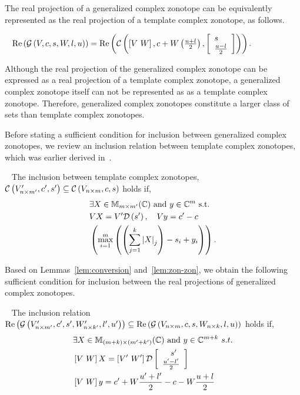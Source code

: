 


The real projection of a generalized complex zonotope can be
equivalently represented as the real projection of a template complex
zonotope, as follows.  
\begin{lemma}~\label{lem:conversion}
$\real\lt(\gcz{V}{c}{s}{W}{l}{u}\rt) = \real\lt(\cz{\lt[V~W\rt]}{c+W\lt(\frac{u+l}{2}\rt)}{\ColumnJoin{s}{\frac{u-l}{2}}}\rt)$.
\end{lemma}
Although the real projection of the generalized complex zonotope can
be expressed as a real projection of a template complex zonotope, a
generalized complex zonotope itself can not be represented as as a
template complex zonotope.  Therefore, generalized complex zonotopes
constitute a larger class of sets than template complex zonotopes.

Before stating a sufficient condition for inclusion between generalized complex
zonotopes, we review an inclusion relation between template complex
zonotopes, which was earlier derived in~\cite{todo}.
\begin{lemma}~\label{lem:zon-zon} The inclusion between template complex zonotopes,
  $\cz{V^\pr_{n\times m^\pr}}{c^\pr}{s^\pr}\subseteq \cz{V_{n\times m}}{c}{s}$ holds if,
\begin{align}
\begin{split}
& \exists X\in\mat{m}{m^\pr}{\mb{C}}~\text{and}~y\in\mb{C}^{m}~\text{s.t.}\\
& \transfer{V}{V^\pr}{s^\pr}{X},~~~\centertransfer{V}{c}{c^\pr}{y}\\
& \lt(\scalebound{X}{y}{s}{m}{k}\rt).\\
\end{split}
\end{align}
\end{lemma}

Based on Lemmas~\ref{lem:conversion} and~\ref{lem:zon-zon}, we obtain
the following sufficient condition for inclusion between the real
projections of generalized complex zonotopes.
\begin{lemma}~\label{lem:gcz-gcz}
The inclusion relation
$\real\lt(\gcz{V^\pr_{n\times m^\pr}}{c^\pr}{s^\pr}{W^\pr_{n\times k^\pr}}{l^\pr}{u^\pr}\rt)\subseteq
\real\lt(\gcz{V_{n\times m}}{c}{s}{W_{n\times k}}{l}{u}\rt)$ holds if,
\begin{align}
\begin{split}
& \exists X\in\mat{(m+k)}{(m^\pr+k^\pr)}{\mb{C}}~\text{and}~y\in\mb{C}^{m+k}~s.t.\\
& \lt[V~W\rt]X = \lt[V^\pr~W^\pr\rt]\dg\ColumnJoin{\hspace{1em}s^\pr}{\frac{u^\pr-l^\pr}{2}}\\
& \lt[V~W\rt]y = c^\pr+W\frac{u^\pr+l^\pr}{2}-c-W\frac{u+l}{2}
\end{split}
\end{align}
\end{lemma}

